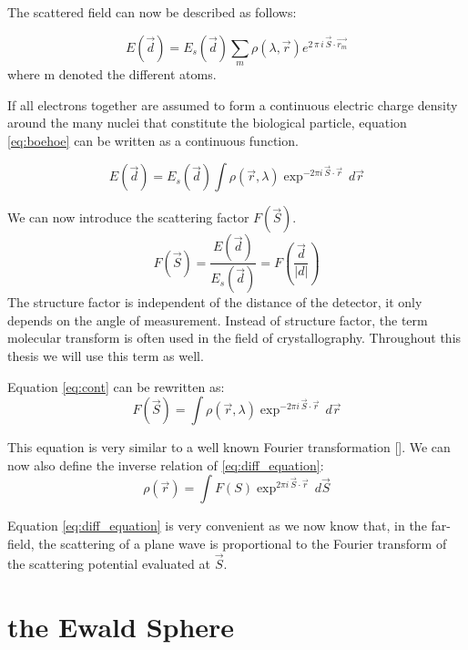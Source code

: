 The scattered field can now be described as follows:

\begin{equation}\label{eq:boehoe}
E(\vec{d}) = E_s(\vec{d}) \sum_{m} \rho(\lambda,\vec{r}) e^{2\,\pi\,  i\,\vec{S}\cdot\vec{r_m}}
\end{equation}
where m denoted the different atoms.

If all electrons together are assumed to form a continuous electric charge density around the many nuclei that constitute the biological particle, equation \ref{eq:boehoe}  can be written as a continuous function. 

\begin{equation}\label{eq:cont}
E(\vec{d}) = E_s(\vec{d})\int \rho(\vec{r},\lambda) \exp^{-2\pi i \,\vec{S} \cdot \vec{r}}\,d\vec{r}
\end{equation}

We can now introduce the scattering factor $F(\vec{S})$.
\begin{equation}
F\left(\vec{S}\right) = \frac{E(\vec{d})}{E_s(\vec{d})} = F\left(\frac{\vec{d}}{|d|}\right)
\end{equation}
The structure factor is independent of the distance of the detector, it only depends on the angle of measurement. Instead of structure factor, the term molecular transform is often used in the field of crystallography. Throughout this thesis we will use this term as well.

Equation \ref{eq:cont} can be rewritten as:
\begin{equation}\label{eq:diff_equation}
F(\vec{S}) = \int \rho(\vec{r},\lambda) \exp^{-2\pi i \,\vec{S} \cdot \vec{r}}\,d\vec{r}
\end{equation}

This equation is very similar to a well known Fourier transformation []. We can now also define the inverse relation of \ref{eq:diff_equation}:
\begin{equation}
\rho(\vec{r}) = \int F(S) \exp^{2\pi i \,\vec{S} \cdot \vec{r}}\,d\vec{S}
\end{equation}

Equation \ref{eq:diff_equation} is very convenient as we now know that, in the far-field, the scattering of a plane wave is proportional to the Fourier transform of the scattering potential evaluated at $\vec{S}$.

\section{the Ewald Sphere}

